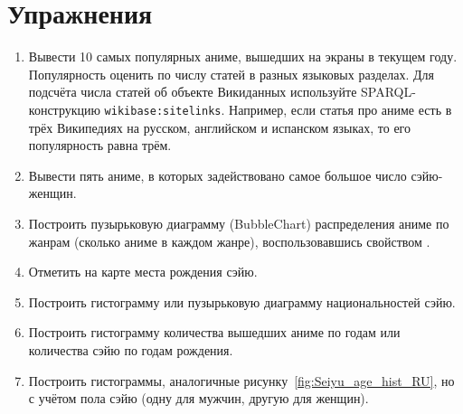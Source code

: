 \section{Упражнения}

\begin{enumerate}
    \item Вывести 10 самых популярных аниме, вышедших на экраны в текущем году. Популярность оценить по числу статей в разных языковых разделах. Для подсчёта числа статей об объекте Викиданных используйте SPARQL-конструкцию \lstinline|wikibase:sitelinks|. Например, если статья про аниме есть в трёх Википедиях на русском, английском и испанском языках, то его популярность равна трём. 
    \item Вывести пять аниме, в которых задействовано самое большое число сэйю-женщин.
    \item Построить пузырьковую диаграмму (BubbleChart) распределения аниме по жанрам (сколько аниме в каждом жанре), воспользовавшись свойством .
    \item Отметить на карте места рождения сэйю.
    \item Построить гистограмму или пузырьковую диаграмму национальностей сэйю.
    \item Построить гистограмму количества вышедших аниме по годам или количества сэйю по годам рождения.
    \item Построить гистограммы, аналогичные рисунку~\ref{fig:Seiyu_age_hist_RU}, но с учётом пола сэйю (одну для мужчин, другую для женщин).
\end{enumerate}
